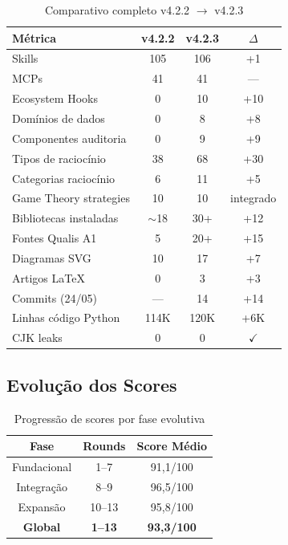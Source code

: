 \documentclass[12pt,a4paper]{article}
\begin{document}
\begin{table}[H]
  \centering
  \caption{Comparativo completo v4.2.2 $\rightarrow$ v4.2.3}
  \begin{tabular}{l c c c}
    \toprule
    \textbf{Métrica} & \textbf{v4.2.2} & \textbf{v4.2.3} & \textbf{$\Delta$} \\
    \midrule
    Skills                 & 105  & 106  & +1 \\
    MCPs                   & 41   & 41   & --- \\
    Ecosystem Hooks        & 0    & 10   & +10 \\
    Domínios de dados      & 0    & 8    & +8 \\
    Componentes auditoria  & 0    & 9    & +9 \\
    Tipos de raciocínio    & 38   & 68   & +30 \\
    Categorias raciocínio  & 6    & 11   & +5 \\
    Game Theory strategies & 10   & 10   & integrado \\
    Bibliotecas instaladas & $\sim$18 & 30+ & +12 \\
    Fontes Qualis A1       & 5    & 20+  & +15 \\
    Diagramas SVG          & 10   & 17   & +7 \\
    Artigos LaTeX          & 0    & 3    & +3 \\
    Commits (24/05)        & ---  & 14   & +14 \\
    Linhas código Python   & 114K & 120K & +6K \\
    CJK leaks              & 0    & 0    & $\checkmark$ \\
    \bottomrule
  \end{tabular}
\end{table}

\subsection{Evolução dos Scores}

\begin{table}[H]
  \centering
  \caption{Progressão de scores por fase evolutiva}
  \begin{tabular}{c c c}
    \toprule
    \textbf{Fase} & \textbf{Rounds} & \textbf{Score Médio} \\
    \midrule
    Fundacional    & 1--7   & 91,1/100 \\
    Integração     & 8--9   & 96,5/100 \\
    Expansão       & 10--13 & 95,8/100 \\
    \textbf{Global} & \textbf{1--13} & \textbf{93,3/100} \\
    \bottomrule
  \end{tabular}
\end{table}
\end{document}
